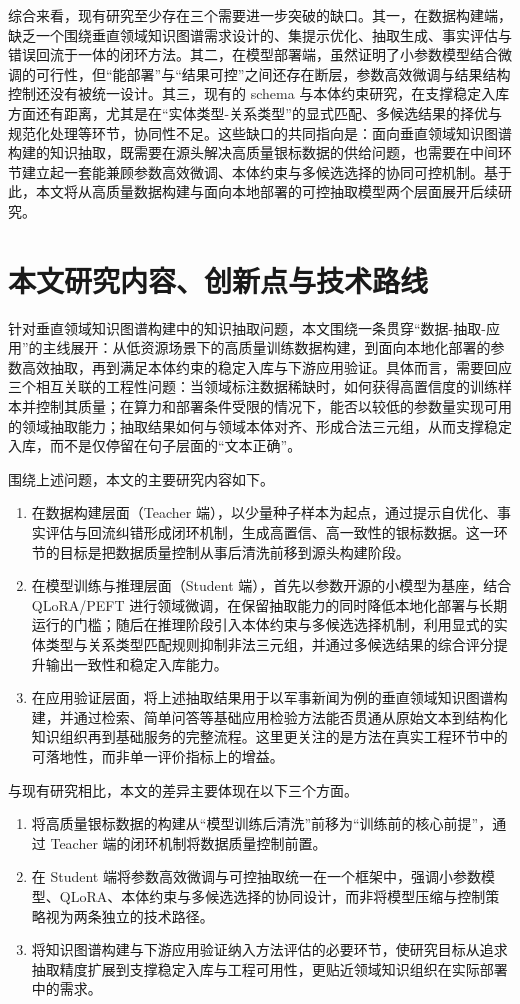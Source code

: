 综合来看，现有研究至少存在三个需要进一步突破的缺口。其一，在数据构建端，缺乏一个围绕垂直领域知识图谱需求设计的、集提示优化、抽取生成、事实评估与错误回流于一体的闭环方法。其二，在模型部署端，虽然证明了小参数模型结合微调的可行性，但“能部署”与“结果可控”之间还存在断层，参数高效微调与结果结构控制还没有被统一设计。其三，现有的 schema 与本体约束研究，在支撑稳定入库方面还有距离，尤其是在“实体类型-关系类型”的显式匹配、多候选结果的择优与规范化处理等环节，协同性不足。这些缺口的共同指向是：面向垂直领域知识图谱构建的知识抽取，既需要在源头解决高质量银标数据的供给问题，也需要在中间环节建立起一套能兼顾参数高效微调、本体约束与多候选选择的协同可控机制。基于此，本文将从高质量数据构建与面向本地部署的可控抽取模型两个层面展开后续研究。

\section{本文研究内容、创新点与技术路线}

针对垂直领域知识图谱构建中的知识抽取问题，本文围绕一条贯穿“数据-抽取-应用”的主线展开：从低资源场景下的高质量训练数据构建，到面向本地化部署的参数高效抽取，再到满足本体约束的稳定入库与下游应用验证。具体而言，需要回应三个相互关联的工程性问题：当领域标注数据稀缺时，如何获得高置信度的训练样本并控制其质量；在算力和部署条件受限的情况下，能否以较低的参数量实现可用的领域抽取能力；抽取结果如何与领域本体对齐、形成合法三元组，从而支撑稳定入库，而不是仅停留在句子层面的“文本正确”。

围绕上述问题，本文的主要研究内容如下。
\begin{enumerate}
  \item 在数据构建层面（Teacher 端），以少量种子样本为起点，通过提示自优化、事实评估与回流纠错形成闭环机制，生成高置信、高一致性的银标数据。这一环节的目标是把数据质量控制从事后清洗前移到源头构建阶段。
  \item 在模型训练与推理层面（Student 端），首先以参数开源的小模型为基座，结合 QLoRA/PEFT 进行领域微调，在保留抽取能力的同时降低本地化部署与长期运行的门槛；随后在推理阶段引入本体约束与多候选选择机制，利用显式的实体类型与关系类型匹配规则抑制非法三元组，并通过多候选结果的综合评分提升输出一致性和稳定入库能力。
  \item 在应用验证层面，将上述抽取结果用于以军事新闻为例的垂直领域知识图谱构建，并通过检索、简单问答等基础应用检验方法能否贯通从原始文本到结构化知识组织再到基础服务的完整流程。这里更关注的是方法在真实工程环节中的可落地性，而非单一评价指标上的增益。
\end{enumerate}

与现有研究相比，本文的差异主要体现在以下三个方面。
\begin{enumerate}
  \item 将高质量银标数据的构建从“模型训练后清洗”前移为“训练前的核心前提”，通过 Teacher 端的闭环机制将数据质量控制前置。
  \item 在 Student 端将参数高效微调与可控抽取统一在一个框架中，强调小参数模型、QLoRA、本体约束与多候选选择的协同设计，而非将模型压缩与控制策略视为两条独立的技术路径。
  \item 将知识图谱构建与下游应用验证纳入方法评估的必要环节，使研究目标从追求抽取精度扩展到支撑稳定入库与工程可用性，更贴近领域知识组织在实际部署中的需求。
\end{enumerate}

